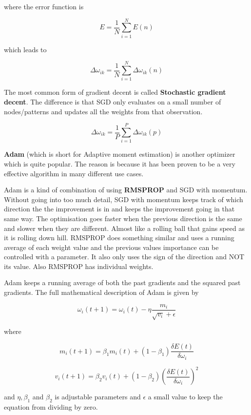 \begin{center}
where the error function is
\end{center}

\[E = \frac{1}{N} \displaystyle\sum_{i=1}^{N} E(n) \]

\begin{center}
which leads to
\end{center}

\[ \Delta\omega_{ik} = \frac{1}{N}  \displaystyle\sum_{i=1}^{N} \Delta\omega_{ik}(n) \]

The most common form of gradient decent is called \textbf{Stochastic gradient decent}.
The difference is that SGD only evaluates on a small number of nodes/patterns and updates all the weights from that observation.

\[ \Delta\omega_{ik} = \frac{1}{P}  \displaystyle\sum_{i=1}^{P} \Delta\omega_{ik}(p) \]

\textbf{Adam} (which is short for Adaptive moment estimation) is another optimizer which is quite popular.
The reason is because it has been proven to be a very effective algorithm in many different use cases.

Adam is a kind of combination of using \textbf{RMSPROP} and SGD with momentum.
Without going into too much detail, SGD with momentum keeps track of which direction the the improvement is in and keeps the improvement going in that same way. The optimisation goes faster when the previous direction is the same and slower when they are different. Almost like a rolling ball that gains speed as it is rolling down hill.
RMSPROP does something similar and uses a running average of each weight value and the previous values importance can be controlled with a parameter. It also only uses the sign of the direction and NOT its value. Also RMSPROP has individual weights.

Adam keeps a running average of both the past gradients and the squared past gradients.
The full mathematical description of Adam is given by

\[ \omega_i (t+1) = \omega_i(t) - \eta \frac{m_i}{\sqrt{v_i} + \epsilon} \]

where

\[ m_i (t+1) = \beta_1m_i(t) + (1 - \beta_1) \frac{ \delta E(t) }{\delta\omega_i} \]

\[ v_i (t+1) = \beta_2v_i(t) + (1 - \beta_2) (\frac{ \delta E(t) }{\delta\omega_i})^2 \]

and $ \eta, \beta_1 $ and $ \beta_2 $ is adjustable parameters and $ \epsilon $ a small value to keep the equation from dividing by zero.\\

